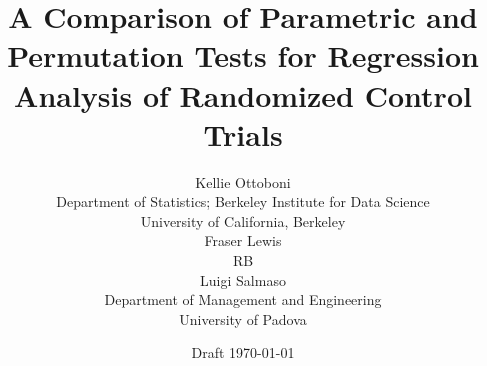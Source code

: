 \documentclass[11pt]{article}
\begin{document}



\title{A Comparison of Parametric and Permutation Tests for Regression Analysis of Randomized Control Trials}
%

\author{Kellie Ottoboni \\
Department of Statistics; Berkeley Institute for Data Science\\
University of California, Berkeley \\ [.2in]
Fraser Lewis \\
RB\\ [.2in]
Luigi Salmaso\\
Department of Management and Engineering \\
University of Padova
}\date{Draft \today}
\maketitle
\end{document}
